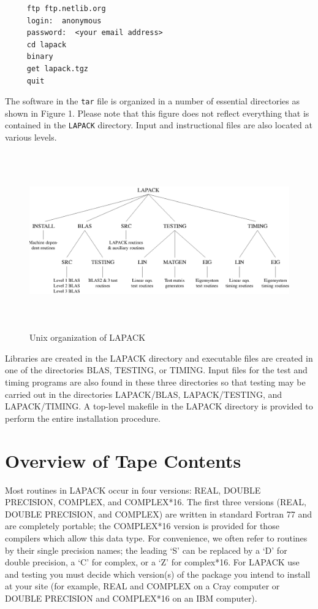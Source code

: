 \documentclass[11pt]{report}
\begin{document}
\begin{verbatim}
     ftp ftp.netlib.org
     login:  anonymous
     password:  <your email address>
     cd lapack
     binary
     get lapack.tgz
     quit
\end{verbatim}

The software in the \texttt{tar} file
is organized in a number of essential directories as shown
in Figure 1.  Please note that this figure does not reflect everything
that is contained in the \texttt{LAPACK} directory.  Input and instructional
files are also located at various levels.
\begin{figure}
\vspace{11pt}
\centerline{\includegraphics[width=6.5in,height=3in]{org2}}
\caption{Unix organization of LAPACK}
\vspace{11pt}
\end{figure}
Libraries are created in the LAPACK directory and 
executable files are created in one of the directories BLAS, TESTING,
or TIMING.  Input files for the test and timing programs are also
found in these three directories so that testing may be carried out
in the directories LAPACK/BLAS, LAPACK/TESTING, and LAPACK/TIMING.
A top-level makefile in the LAPACK directory is provided to perform the 
entire installation procedure.

\section{Overview of Tape Contents}\label{overview}

Most routines in LAPACK occur in four versions: REAL,
DOUBLE PRECISION, COMPLEX, and COMPLEX*16.
The first three versions (REAL, DOUBLE PRECISION, and COMPLEX)
are written in standard Fortran 77 and are completely portable;
the COMPLEX*16 version is provided for
those compilers which allow this data type.  
For convenience, we often refer to routines by their single precision
names; the leading `S' can be replaced by a `D' for double precision,
a `C' for complex, or a `Z' for complex*16.  
For LAPACK use and testing you must decide which version(s)
of the package you intend to install at your site (for example,
REAL and COMPLEX on a Cray computer or DOUBLE PRECISION and
COMPLEX*16 on an IBM computer).
\end{document}
